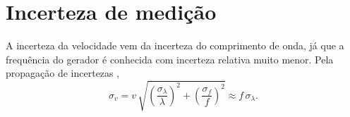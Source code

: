 \section{Incerteza de medição}

A incerteza da velocidade vem da incerteza do comprimento de onda, já que a frequência do gerador é conhecida com incerteza relativa muito menor. Pela propagação de incertezas \cite{vuolo1996,taylor1997},
\begin{equation}
  \sigma_v = v\,\sqrt{\left(\frac{\sigma_\lambda}{\lambda}\right)^{2} + \left(\frac{\sigma_f}{f}\right)^{2}} \approx f\,\sigma_\lambda .
  \label{eq:incerteza}
\end{equation}

